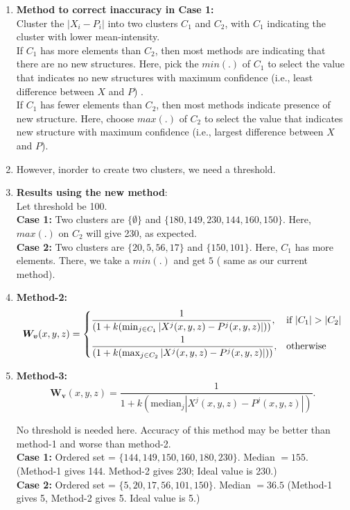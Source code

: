 \documentclass{article}
\begin{document}
\begin{enumerate}
\item \textbf{Method to correct inaccuracy in Case 1:}\\
  Cluster the $|X_i-P_i|$ into two clusters $C_1$ and $C_2$, with $C_1$ indicating the cluster with lower mean-intensity.\\
  If $C_1$ has more elements than $C_2$, then most methods are indicating that there are no new structures. Here, pick the $min(.)$ of $C_1$ to select the value that indicates no new structures with maximum confidence (i.e., least difference between $X$ and $P$) .\\
  If $C_1$ has fewer elements than $C_2$, then most methods indicate presence of new structure. Here, choose $max(.)$  of $C_2$ to select the value that indicates new structure with maximum confidence (i.e., largest difference between $X$ and $P$).\\

\item However, inorder to create two clusters, we need a threshold.   
\item \textbf{Results using the new method}:\\
  Let threshold be 100.\\
  \textbf{Case 1:} Two clusters are $\{\emptyset\}$ and $\{180, 149, 230, 144, 160, 150\}$. Here, $max(.)$ on $C_2$ will give 230, as expected.\\
  \textbf{Case 2:} Two clusters are $\{20, 5, 56, 17\}$ and $\{150, 101\}$. Here, $C_1$ has more elements. There, we take a $min(.)$ and get $5$ ( same as our current method).

\item {\textbf{Method-2:}}\\
  
 
\[
     \boldsymbol{W_v}(x,y,z)= 
\begin{dcases}
    \frac{1}{(1+k(\min_{j\in C_1}|X^j(x,y,z) - P^j(x,y,z)|))},& \text{if } |C_1|>|C_2|\\
    \frac{1}{(1+k(\max_{j\in C_2}|X^j(x,y,z) - P^j(x,y,z)|))},              & \text{otherwise}
\end{dcases}
\]

\item \textbf{Method-3:}\\
  \begin{equation}
    \boldsymbol{W_v}(x,y,z) = \frac{1}{1+k(\textrm{median}_{j}|X^j(x,y,z) - P^j(x,y,z)|)}.
    \label{eq:weightsEqMethod3}
  \end{equation}

  No threshold is needed here. Accuracy of this method may be better than method-1 and worse than method-2.\\

  \textbf{Case 1:} Ordered set = $\{144, 149, 150, 160, 180, 230\}$. Median $= 155$. (Method-1 gives 144. Method-2 gives 230;  Ideal value is 230.)\\
  \textbf{Case 2:} Ordered set = $\{5, 20, 17, 56, 101, 150\}$. Median $= 36.5$ (Method-1 gives 5, Method-2 gives 5. Ideal value is 5.)
  
\end{enumerate}
\end{document}
